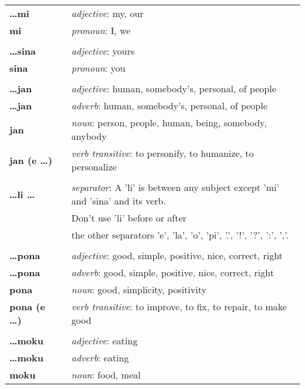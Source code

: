 \begin{supertabular}{p{2,5cm}|ll}
\textbf{\dots mi} && \textit{adjective}: my, our \\  %
\textbf{mi} && \textit{pronoun}: I, we  \\ %
 && \\ %
\textbf{\dots sina} && \textit{adjective}: yours \\  %
\textbf{sina} && \textit{pronoun}: you \\ %
 && \\ %
\textbf{\dots jan} && \textit{adjective}: human, somebody's, personal, of people \\ %
\textbf{\dots jan} && \textit{adverb}: human, somebody's, personal, of people \\ %
\textbf{jan} && \textit{noun}: person, people, human, being, somebody, anybody \\ %
\textbf{jan (e \dots)} && \textit{verb transitive}: to personify, to humanize, to personalize \\ %
 && \\ %
\textbf{\dots li \dots} && \textit{separator}: A 'li' is between any subject except 'mi' and 'sina' and its verb. \\ && Don't use 'li' before or after \\ && the other separators 'e', 'la', 'o', 'pi', '.', '!', '?', ':', ','. \\ %
 && \\ %
\textbf{\dots pona} && \textit{adjective}: good, simple, positive, nice, correct, right \\ %
\textbf{\dots pona} && \textit{adverb}: good, simple, positive, nice, correct, right \\ %
\textbf{pona} && \textit{noun}: good, simplicity, positivity \\ %
\textbf{pona (e \dots)} && \textit{verb transitive}: to improve, to fix, to repair, to make good \\ %
 && \\ %
\textbf{\dots moku} && \textit{adjective}: eating \\ %
\textbf{\dots moku} && \textit{adverb}: eating \\ %
\textbf{moku} && \textit{noun}: food, meal \\ %

\end{supertabular}

